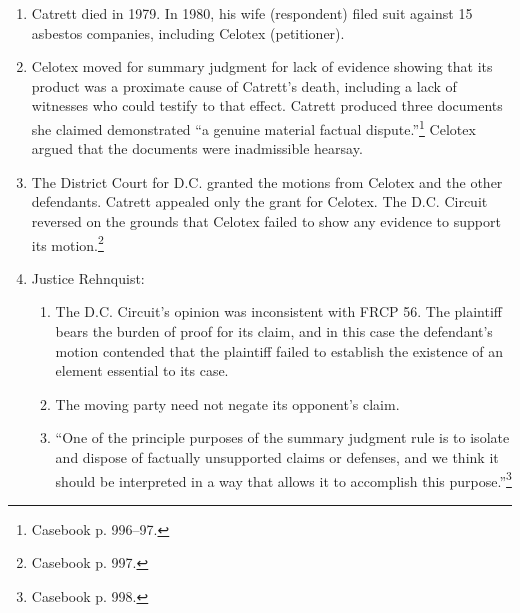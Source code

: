 \begin{enumerate}
    \item Catrett died in 1979. In 1980, his wife (respondent) filed suit against 15 asbestos companies, including Celotex (petitioner).
    \item Celotex moved for summary judgment for lack of evidence showing that its product was a proximate cause of Catrett's death, including a lack of witnesses who could testify to that effect. Catrett produced three documents she claimed demonstrated ``a genuine material factual dispute.''\footnote{Casebook p. 996--97.} Celotex argued that the documents were inadmissible hearsay.
    \item The District Court for D.C. granted the motions from Celotex and the other defendants. Catrett appealed only the grant for Celotex. The D.C. Circuit reversed on the grounds that Celotex failed to show any evidence to support its motion.\footnote{Casebook p. 997.}
    \item Justice Rehnquist:
    \begin{enumerate}
        \item The D.C. Circuit's opinion was inconsistent with FRCP 56. The plaintiff bears the burden of proof for its claim, and in this case the defendant's motion contended that the plaintiff failed to establish the existence of an element essential to its case.
        \item The moving party need not negate its opponent's claim.
        \item ``One of the principle purposes of the summary judgment rule is to isolate and dispose of factually unsupported claims or defenses, and we think it should be interpreted in a way that allows it to accomplish this purpose.''\footnote{Casebook p. 998.}

    \end{enumerate}
\end{enumerate}

% 
% 
% 
